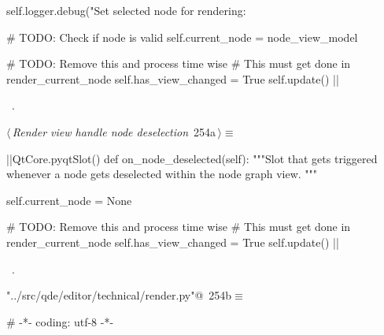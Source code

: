 \documentclass[%
    a4paper,    %
    justified,  %
    nobib,      %
    openany     %
]{tufte-book}
\makeatletter
\renewcommand{\label}[1]{\@tufte@label{##1}}%
\makeatother
\begin{document}
\begin{fullwidth}
\begin{flushleft}
\begin{minipage}{\linewidth}
\begin{pythoncode}
    self.logger.debug("Set selected node for rendering: %

    # TODO: Check if node is valid
    self.current_node = node_view_model

    # TODO: Remove this and process time wise
    # This must get done in render_current_node
    self.has_view_changed = True
    self.update()
|\NWsep|
\end{pythoncode}
\vspace{1.5ex}
\footnotesize
\begin{list}{}{\setlength{\itemsep}{-\parsep}\setlength{\itemindent}{-\leftmargin}}
\item \NWtxtMacroRefIn\ .

\item{}
\end{list}
\end{minipage}\vspace{4ex}
\end{flushleft}
\begin{flushleft} \small
\begin{minipage}{\linewidth}\label{scrap280}\raggedright\small
{} $\langle\,${\itshape Render view handle node deselection}\nobreak\ {\footnotesize {254a}}$\,\rangle\equiv$
\vspace{-1ex}
\begin{pythoncode}
|\normalfont{}\fontfamily{}|QtCore.pyqtSlot()
def on_node_deselected(self):
    """Slot that gets triggered whenever a node gets deselected within the
    node graph view.
    """

    self.current_node = None

    # TODO: Remove this and process time wise
    # This must get done in render_current_node
    self.has_view_changed = True
    self.update()
|\NWsep|
\end{pythoncode}
\vspace{1.5ex}
\footnotesize
\begin{list}{}{\setlength{\itemsep}{-\parsep}\setlength{\itemindent}{-\leftmargin}}
\item \NWtxtMacroRefIn\ .

\item{}
\end{list}
\end{minipage}\vspace{4ex}
\end{flushleft}
\begin{flushleft} \small
\begin{minipage}{\linewidth}\label{scrap281}\raggedright\small
{} \verb@"../src/qde/editor/technical/render.py"@\nobreak\ {\footnotesize {254b}}$\equiv$
\vspace{-1ex}
\begin{pythoncode}
# -*- coding: utf-8 -*-


\end{pythoncode}
\end{minipage}
\end{flushleft}
\end{fullwidth}
\end{document}

